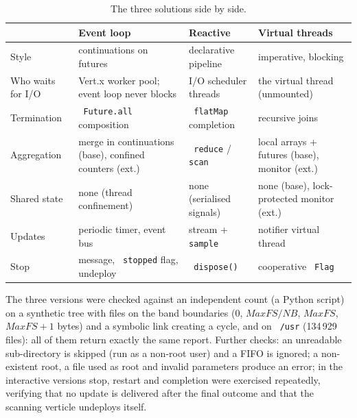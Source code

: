 \documentclass[11pt,a4paper]{article}
\newcommand{\code}[1]{\texttt{\hyphenchar\font=-1 #1}}
\begin{document}
\begin{table}[h]
\centering\small
\begin{tabularx}{\textwidth}{@{}lYYY@{}}
\toprule
 & \textbf{Event loop} & \textbf{Reactive} & \textbf{Virtual threads} \\
\midrule
Style & continuations on futures & declarative pipeline & imperative, blocking \\
Who waits for I/O & Vert.x worker pool; event loop never blocks & I/O scheduler threads & the virtual thread (unmounted) \\
Termination & \code{Future.all} composition & \code{flatMap} completion & recursive joins \\
Aggregation & merge in continuations (base), confined counters (ext.) & \code{reduce} / \code{scan} & local arrays + futures (base), monitor (ext.) \\
Shared state & none (thread confinement) & none (serialised signals) & none (base), lock-protected monitor (ext.) \\
Updates & periodic timer, event bus & stream + \code{sample} & notifier virtual thread \\
Stop & message, \code{stopped} flag, undeploy & \code{dispose()} & cooperative \code{Flag} \\
\bottomrule
\end{tabularx}
\caption{The three solutions side by side.}
\end{table}

The three versions were checked against an independent count (a Python script) on a synthetic tree
with files on the band boundaries ($0$, $MaxFS/NB$, $MaxFS$, $MaxFS+1$ bytes) and a symbolic link creating
a cycle, and on \code{/usr} (134\,929 files): all of them return exactly the same report.
Further checks: an unreadable sub-directory is skipped (run as a non-root user) and a FIFO is ignored; a non-existent
root, a file used as root and invalid parameters produce an error; in the interactive versions
stop, restart and completion were exercised repeatedly, verifying that no update is delivered after
the final outcome and that the scanning verticle undeploys itself.
\end{document}
